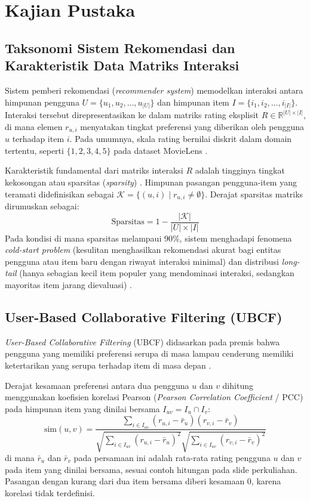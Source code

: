 \chapter{Kajian Pustaka}

\section{Taksonomi Sistem Rekomendasi dan Karakteristik Data Matriks Interaksi}
Sistem pemberi rekomendasi (\textit{recommender system}) memodelkan interaksi antara himpunan pengguna $U = \{u_1, u_2, \dots, u_{|U|}\}$ dan himpunan item $I = \{i_1, i_2, \dots, i_{|I|}\}$. Interaksi tersebut direpresentasikan ke dalam matriks rating eksplisit $R \in \mathbb{R}^{|U| \times |I|}$, di mana elemen $r_{u,i}$ menyatakan tingkat preferensi yang diberikan oleh pengguna $u$ terhadap item $i$. Pada umumnya, skala rating bernilai diskrit dalam domain tertentu, seperti $\{1, 2, 3, 4, 5\}$ pada dataset MovieLens \citep{harper2015movielens}.

Karakteristik fundamental dari matriks interaksi $R$ adalah tingginya tingkat kekosongan atau sparsitas (\textit{sparsity}) \citep{ricci2015recommender}. Himpunan pasangan pengguna-item yang teramati didefinisikan sebagai $\mathcal{K} = \{(u, i) \mid r_{u,i} \neq \emptyset\}$. Derajat sparsitas matriks dirumuskan sebagai:
\begin{equation}
\label{eq:sparsity}
\text{Sparsitas} = 1 - \frac{|\mathcal{K}|}{|U| \times |I|}
\end{equation}
Pada kondisi di mana sparsitas melampaui 90\%, sistem menghadapi fenomena \textit{cold-start problem} (kesulitan menghasilkan rekomendasi akurat bagi entitas pengguna atau item baru dengan riwayat interaksi minimal) dan distribusi \textit{long-tail} (hanya sebagian kecil item populer yang mendominasi interaksi, sedangkan mayoritas item jarang dievaluasi) \citep{jannach2010recommender}.

\section{User-Based Collaborative Filtering (UBCF)}
\textit{User-Based Collaborative Filtering} (UBCF) didasarkan pada premis bahwa pengguna yang memiliki preferensi serupa di masa lampau cenderung memiliki ketertarikan yang serupa terhadap item di masa depan \citep{resnick1994grouplens}. 

Derajat kesamaan preferensi antara dua pengguna $u$ dan $v$ dihitung menggunakan koefisien korelasi Pearson (\textit{Pearson Correlation Coefficient} / PCC) pada himpunan item yang dinilai bersama $I_{uv} = I_u \cap I_v$:
\begin{equation}
\label{eq:pcc}
\text{sim}(u, v) = \frac{\sum_{i \in I_{uv}} (r_{u,i} - \bar{r}_u)(r_{v,i} - \bar{r}_v)}{\sqrt{\sum_{i \in I_{uv}} (r_{u,i} - \bar{r}_u)^2} \sqrt{\sum_{i \in I_{uv}} (r_{v,i} - \bar{r}_v)^2}}
\end{equation}
di mana $\bar{r}_u$ dan $\bar{r}_v$ pada persamaan ini adalah rata-rata rating pengguna $u$ dan $v$ pada item yang dinilai bersama, sesuai contoh hitungan pada slide perkuliahan. Pasangan dengan kurang dari dua item bersama diberi kesamaan 0, karena korelasi tidak terdefinisi.

